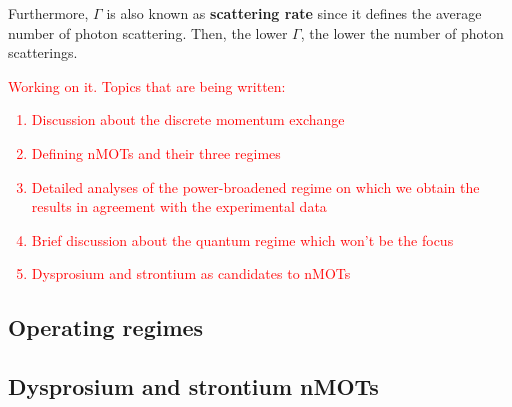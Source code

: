 Furthermore, $ \Gamma $ is also known as \textbf{scattering rate} since it defines the average number of photon scattering. Then, the lower $ \Gamma $, the lower the number of photon scatterings.

\textcolor{red}{Working on it. Topics that are being written:
\begin{enumerate}
    \item Discussion about the discrete momentum exchange
    \item Defining nMOTs and their three regimes
    \item Detailed analyses of the power-broadened regime on which we obtain the results in agreement with the experimental data
    \item Brief discussion about the quantum regime which won't be the focus
    \item Dysprosium and strontium as candidates to nMOTs
\end{enumerate}
}

\subsection{Operating regimes}
\label{sec:nMOT-operating-regimes}

\subsection{Dysprosium and strontium nMOTs}
\label{sec:nMOT-operating-regimes}
